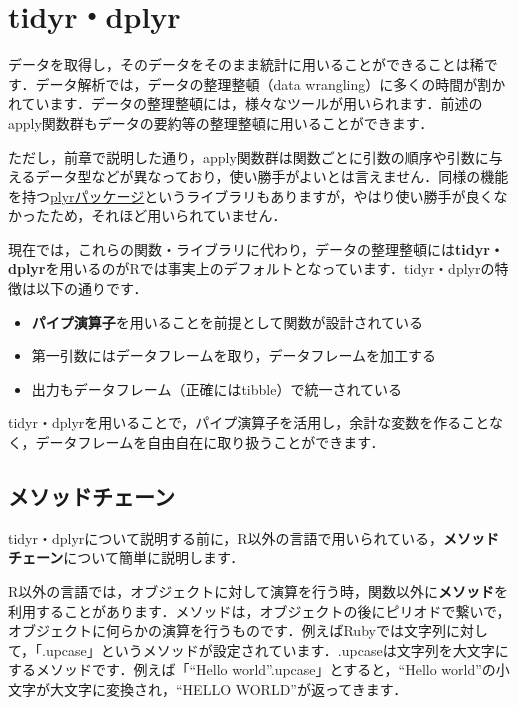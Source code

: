 \documentclass[
  letterpaper,
  DIV=11,
  numbers=noendperiod]{scrreprt}
\providecommand{\tightlist}{%
  \setlength{\itemsep}{0pt}\setlength{\parskip}{0pt}}\usepackage{longtable,booktabs,array}
\begin{document}

\hypertarget{tidyrdplyr}{%
\chapter{tidyr・dplyr}\label{tidyrdplyr}}

データを取得し，そのデータをそのまま統計に用いることができることは稀です．データ解析では，データの整理整頓（data
wrangling）に多くの時間が割かれています．データの整理整頓には，様々なツールが用いられます．前述のapply関数群もデータの要約等の整理整頓に用いることができます．

ただし，前章で説明した通り，apply関数群は関数ごとに引数の順序や引数に与えるデータ型などが異なっており，使い勝手がよいとは言えません．同様の機能を持つ\href{https://cran.r-project.org/web/packages/plyr/index.html}{plyrパッケージ}というライブラリもありますが，やはり使い勝手が良くなかったため，それほど用いられていません．

現在では，これらの関数・ライブラリに代わり，データの整理整頓には\textbf{tidyr・dplyr}を用いるのがRでは事実上のデフォルトとなっています．tidyr・dplyrの特徴は以下の通りです．

\begin{itemize}
\tightlist
\item
  \textbf{パイプ演算子}を用いることを前提として関数が設計されている
\item
  第一引数にはデータフレームを取り，データフレームを加工する
\item
  出力もデータフレーム（正確にはtibble）で統一されている
\end{itemize}

tidyr・dplyrを用いることで，パイプ演算子を活用し，余計な変数を作ることなく，データフレームを自由自在に取り扱うことができます．

\hypertarget{ux30e1ux30bdux30c3ux30c9ux30c1ux30a7ux30fcux30f3}{%
\section{メソッドチェーン}\label{ux30e1ux30bdux30c3ux30c9ux30c1ux30a7ux30fcux30f3}}

tidyr・dplyrについて説明する前に，R以外の言語で用いられている，\textbf{メソッドチェーン}について簡単に説明します．

R以外の言語では，オブジェクトに対して演算を行う時，関数以外に\textbf{メソッド}を利用することがあります．メソッドは，オブジェクトの後にピリオドで繋いで，オブジェクトに何らかの演算を行うものです．例えばRubyでは文字列に対して，「.upcase」というメソッドが設定されています．.upcaseは文字列を大文字にするメソッドです．例えば「``Hello
world''.upcase」とすると，``Hello
world''の小文字が大文字に変換され，``HELLO WORLD''が返ってきます．
\end{document}
